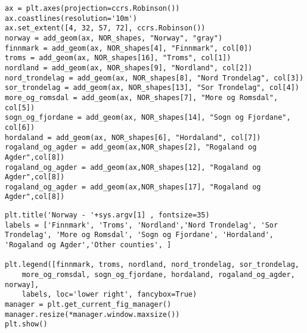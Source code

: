 \begin{lstlisting}
ax = plt.axes(projection=ccrs.Robinson())
ax.coastlines(resolution='10m')
ax.set_extent([4, 32, 57, 72], ccrs.Robinson())	
norway = add_geom(ax, NOR_shapes, "Norway", "gray")
finnmark = add_geom(ax, NOR_shapes[4], "Finnmark", col[0])
troms = add_geom(ax, NOR_shapes[16], "Troms", col[1])
nordland = add_geom(ax, NOR_shapes[9], "Nordland", col[2])
nord_trondelag = add_geom(ax, NOR_shapes[8], "Nord Trondelag", col[3])
sor_trondelag = add_geom(ax, NOR_shapes[13], "Sor Trondelag", col[4])
more_og_romsdal = add_geom(ax, NOR_shapes[7], "More og Romsdal", col[5])
sogn_og_fjordane = add_geom(ax, NOR_shapes[14], "Sogn og Fjordane", col[6])
hordaland = add_geom(ax, NOR_shapes[6], "Hordaland", col[7])
rogaland_og_agder = add_geom(ax,NOR_shapes[2], "Rogaland og Agder",col[8])
rogaland_og_agder = add_geom(ax,NOR_shapes[12], "Rogaland og Agder",col[8])
rogaland_og_agder = add_geom(ax,NOR_shapes[17], "Rogaland og Agder",col[8])
\end{lstlisting}
\begin{lstlisting}
plt.title('Norway - '+sys.argv[1] , fontsize=35)
labels = ['Finnmark', 'Troms', 'Nordland','Nord Trondelag', 'Sor Trondelag', 'More og Romsdal',	'Sogn og Fjordane', 'Hordaland', 	'Rogaland og Agder','Other counties', ]
	
plt.legend([finnmark, troms, nordland, nord_trondelag, sor_trondelag, 
	more_og_romsdal, sogn_og_fjordane, hordaland, rogaland_og_agder, norway], 
	labels, loc='lower right', fancybox=True)
manager = plt.get_current_fig_manager()
manager.resize(*manager.window.maxsize())
plt.show()


\end{lstlisting}